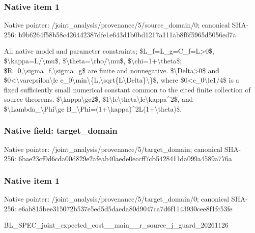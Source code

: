 \documentclass[10pt,a4paper]{article}
\begin{document}
\subsubsection{Native item 1}


Native pointer: /joint\_analysis/provenan\allowbreak{}ce/5/source\_domain/0; canonical SHA-256: b9b6264f58b58c426442387d\allowbreak{}fe1e643d1b0bd1217a111ab8\allowbreak{}f6f5965d5056ed7a


All native model and parameter constraints; \$L\_f=L\_g=C\_f=L>0\$, \$\textbackslash{}kappa=L/\textbackslash{}mu\$, \$\textbackslash{}theta=\textbackslash{}rho/\textbackslash{}mu\$, \$\textbackslash{}chi=1+\textbackslash{}theta\$; \$R\_0,\textbackslash{}sigma\_f,\textbackslash{}sigma\_g\$ are finite and nonnegative. \$\textbackslash{}Delta>0\$ and \$0<\textbackslash{}varepsilon\textbackslash{}le c\_0\textbackslash{}min\textbackslash{}\{L,\textbackslash{}sqrt\{L\textbackslash{}Delta\}\textbackslash{}\}\$, where \$0<c\_0\textbackslash{}le1/4\$ is a fixed sufficiently small numerical constant common to the cited finite collection of source theorems. \$\textbackslash{}kappa\textbackslash{}ge2\$, \$1\textbackslash{}le\textbackslash{}theta\textbackslash{}le\textbackslash{}kappa\textasciicircum{}2\$, and \$\textbackslash{}Lambda\_\textbackslash{}Phi\textbackslash{}ge B\_\textbackslash{}Phi=(1+\textbackslash{}kappa)\textasciicircum{}2L(1+\textbackslash{}theta)\$.


\subsubsection{Native field: target\_domain}


Native pointer: /joint\_analysis/provenan\allowbreak{}ce/5/target\_domain; canonical SHA-256: 6bae23cf0d6cda00d829e2af\allowbreak{}eab40aede0eccff7cb542841\allowbreak{}1da099a4589a776a



\subsubsection{Native item 1}


Native pointer: /joint\_analysis/provenan\allowbreak{}ce/5/target\_domain/0; canonical SHA-256: e6ab815bee315072b537e5ed\allowbreak{}5d5daeda80d9047ca7d6f114\allowbreak{}3930cee8f1fc53fe


BL\_SPEC\_joint\_expected\_c\allowbreak{}ost\_\_main\_\_r\_source\_j\_gu\allowbreak{}ard\_20261126
\end{document}
